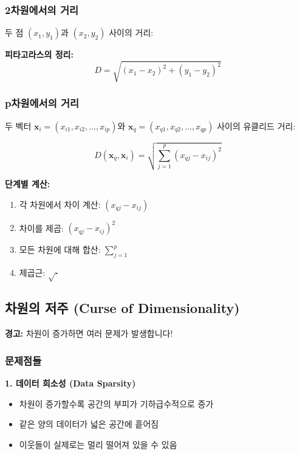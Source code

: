 \documentclass[12pt,a4paper]{article}
\begin{document}
\subsubsection{2차원에서의 거리}

두 점 $(x_1, y_1)$과 $(x_2, y_2)$ 사이의 거리:

\textbf{피타고라스의 정리:}
\begin{equation}
D = \sqrt{(x_1 - x_2)^2 + (y_1 - y_2)^2}
\end{equation}

\subsubsection{p차원에서의 거리}

두 벡터 $\mathbf{x}_i = (x_{i1}, x_{i2}, \ldots, x_{ip})$와
$\mathbf{x}_q = (x_{q1}, x_{q2}, \ldots, x_{qp})$ 사이의 유클리드 거리:

\begin{equation}
D(\mathbf{x}_q, \mathbf{x}_i) = \sqrt{\sum_{j=1}^{p}(x_{qj} - x_{ij})^2}
\end{equation}

\textbf{단계별 계산:}
\begin{enumerate}
    \item 각 차원에서 차이 계산: $(x_{qj} - x_{ij})$
    \item 차이를 제곱: $(x_{qj} - x_{ij})^2$
    \item 모든 차원에 대해 합산: $\sum_{j=1}^{p}$
    \item 제곱근: $\sqrt{\cdot}$
\end{enumerate}

\subsection{차원의 저주 (Curse of Dimensionality)}

\textbf{경고:} 차원이 증가하면 여러 문제가 발생합니다!

\subsubsection{문제점들}

\textbf{1. 데이터 희소성 (Data Sparsity)}
\begin{itemize}
    \item 차원이 증가할수록 공간의 부피가 기하급수적으로 증가
    \item 같은 양의 데이터가 넓은 공간에 흩어짐
    \item 이웃들이 실제로는 멀리 떨어져 있을 수 있음
\end{itemize}
\end{document}
